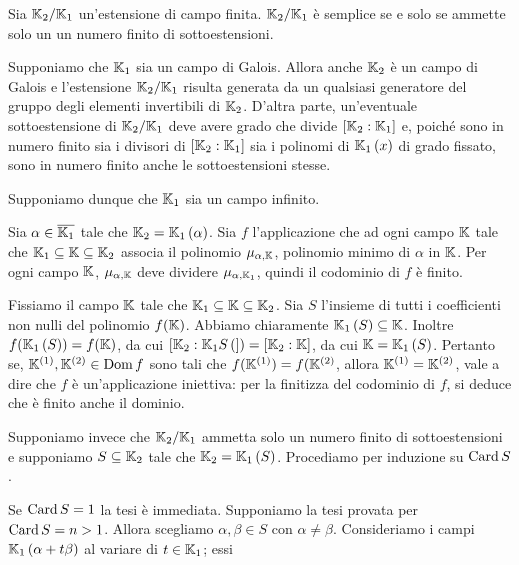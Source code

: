 \begin{Theorem}
	Sia $\mathbb{K}_2/\mathbb{K}_1$ un'estensione di campo finita. $\mathbb{K}_2/\mathbb{K}_1$ \`e semplice se e solo se ammette solo un un numero finito di sottoestensioni.
\end{Theorem}
\Proof Supponiamo che $\mathbb{K}_1$ sia un campo di Galois.
Allora anche $\mathbb{K}_2$ \`e un campo di Galois e l'estensione
$\mathbb{K}_2/\mathbb{K}_1$ risulta generata da un qualsiasi generatore del gruppo degli elementi invertibili di $\mathbb{K}_2$.
D'altra parte, un'eventuale sottoestensione di $\mathbb{K}_2/\mathbb{K}_1$ deve avere grado che divide $[\mathbb{K}_2:\mathbb{K}_1]$ e, poich\'e sono in numero finito sia i divisori di $[\mathbb{K}_2:\mathbb{K}_1]$ sia i polinomi di $\mathbb{K}_1 \left ( x \right )$ di grado fissato, sono in numero finito anche le sottoestensioni stesse.
\par Supponiamo dunque che $\mathbb{K}_1$ sia un campo infinito.
\par Sia $\alpha \in \overline{\mathbb{K}_1}$ tale che $\mathbb{K}_2 = \mathbb{K}_1 \left ( \alpha \right )$. Sia $f$ l'applicazione che ad ogni campo $\mathbb{K}$ tale che $\mathbb{K}_1 \subseteq \mathbb{K} \subseteq \mathbb{K}_2$ associa il polinomio $\MinimalPolynomial{\alpha}[\Field]$, polinomio minimo di $\alpha$ in $\mathbb{K}$. Per ogni campo $\mathbb{K}$, $\MinimalPolynomial{\alpha}[\Field]$ deve dividere $\MinimalPolynomial{\alpha}[\Field_1]$, quindi il codominio di $f$ \`e finito.
\par Fissiamo il campo $\mathbb{K}$ tale che $\mathbb{K}_1 \subseteq \mathbb{K} \subseteq \mathbb{K}_2$. Sia $S$ l'insieme di tutti i coefficienti non nulli del polinomio $f(\mathbb{K})$. Abbiamo chiaramente $\mathbb{K}_1 \left ( S \right ) \subseteq \mathbb{K}$. Inoltre $f(\mathbb{K}_1 \left ( S \right )) = f(\mathbb{K})$, da cui $[\mathbb{K}_2:\mathbb{K}_1{S} \left ( ] \right ) = [\mathbb{K}_2:\mathbb{K}]$, da cui $\mathbb{K} = \mathbb{K}_1 \left ( S \right )$. Pertanto se, $\mathbb{K}^{(1)}, \mathbb{K}^{(2)} \in \operatorname{Dom}{f}$ sono tali che $f(\mathbb{K}^{(1)}) = f(\mathbb{K}^{(2)}$, allora $\mathbb{K}^{(1)} = \mathbb{K}^{(2)}$, vale a dire che $f$ \`e un'applicazione iniettiva: per la finitizza del codominio di $f$, si deduce che \`e finito anche il dominio.
\par Supponiamo invece che $\mathbb{K}_2/\mathbb{K}_1$ ammetta solo un numero finito di sottoestensioni e supponiamo $S \subseteq \mathbb{K}_2$ tale che $\mathbb{K}_2 = \mathbb{K}_1 \left ( S \right )$. Procediamo per induzione su $\operatorname{Card}{S}$.
\par Se $\operatorname{Card}{S} = 1$ la tesi \`e immediata. Supponiamo la tesi provata per $\operatorname{Card}{S} = n > 1$. Allora scegliamo $\alpha, \beta \in S$ con $\alpha \neq \beta$. Consideriamo i campi $\mathbb{K}_1 \left ( \alpha + t \beta \right )$ al variare di $t \in \mathbb{K}_1$; essi
